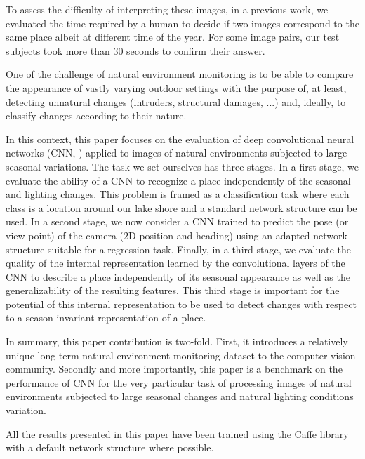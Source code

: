 To assess the difficulty of interpreting these images, in a
previous work, we evaluated the time required by a human to decide if two
images correspond to the same place albeit at different time of the year. For
some image pairs, our test subjects took more than 30 seconds to confirm their answer.  

One of the challenge of natural environment monitoring is to be able to compare
the appearance of vastly varying outdoor settings with the purpose of, at
least, detecting unnatural changes (intruders, structural damages, ...) and, ideally, to
classify changes according to their nature. 

In this context, this paper focuses on the evaluation of deep convolutional
neural networks (CNN, \cite{farabet-pami-13}) applied to images of natural environments
subjected to large seasonal variations. The task we set ourselves has three
stages. In a first stage, we evaluate the ability of a CNN to recognize a place
independently of the seasonal and lighting changes. This problem is framed as a
classification task where each class is a location around our lake shore and a
standard network structure can be used. In a
second stage, we now consider a CNN trained to predict the pose (or view point)
of the camera (2D position and heading) using an adapted network structure
suitable for a regression task. Finally, in a third stage, we evaluate the
quality of the internal representation learned by the convolutional layers of
the CNN to describe a place independently of its seasonal appearance as well as
the generalizability of the resulting features. This third stage is important
for the potential of this internal representation to be used to detect changes
with respect to a season-invariant representation of a place. 

In summary, this paper contribution is two-fold. First, it introduces a
relatively unique long-term natural environment monitoring dataset to the
computer vision community.  Secondly and more importantly, this paper is a
benchmark on the performance of CNN for the very particular task of processing
images of natural environments subjected to large seasonal changes and natural
lighting conditions variation. 

All the results presented in this paper have been trained using the Caffe
library~\cite{jia2014caffe} with a default network structure where possible.  

% 
